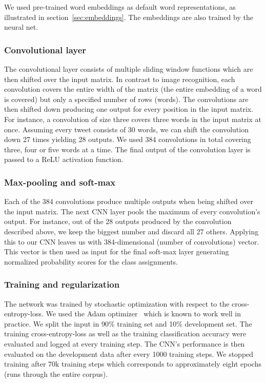 \documentclass[10pt,conference,compsocconf]{IEEEtran}
\begin{document}
We used pre-trained word embeddings as default word representations, as illustrated
in section~\ref{sec:embeddings}. The embeddings are also trained by the neural net.

\subsubsection{Convolutional layer} 
The convolutional layer consists of multiple sliding window functions which are then 
shifted over the input matrix. In contrast to image recognition, each convolution
covers the entire width of the matrix (the entire embedding of a word is covered) but only a specified number of rows (words). The convolutions are then shifted down producing one output for every position in the input matrix. For instance, a convolution of size three
covers three words in the input matrix at once.
Assuming every tweet consists of 30 words, we can shift the convolution down 27 times yielding 28 outputs. We used 384 convolutions in total covering three, four or five words at a time. The final output of the convolution layer is passed to a ReLU activation function.

\subsubsection{Max-pooling and soft-max}
Each of the 384 convolutions produce multiple outputs when being shifted over the input matrix. The next CNN layer pools the maximum of every convolution's output. For instance,
out of the 28 outputs produced by the convolution described above, we keep the
biggest number and discard all 27 others. Applying this to our CNN leaves us with 384-dimensional (number of convolutions) vector. This vector is then used as input for the final soft-max layer generating normalized probability scores for the class assignments. 

\subsubsection{Training and regularization}
The network was trained by stochastic optimization with respect to the cross-entropy-loss. We used the Adam optimizer~\cite{kingmaB14} which is known to work well in practice. We split the input in 90\% training set and 10\% development set.
The training cross-entropy-loss as well as the training classification accuracy were evaluated and logged at every training step. The CNN's performance is then evaluated on the development data after every 1000 training steps. We stopped training after 70k training steps which corresponds to approximately eight epochs (runs through the entire corpus).
\end{document}
